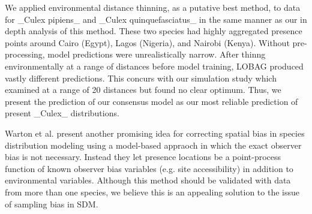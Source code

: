 We applied environmental distance thinning, as a putative best method, to data for _Culex pipiens_ and _Culex quinquefasciatus_ in the same manner as our in depth analysis of this method. These two species had highly aggregated presence points around Cairo (Egypt), Lagos (Nigeria), and Nairobi (Kenya). Without pre-processing, model predictions were unrealistically narrow. After thinng environmentally at a range of distances before model training, LOBAG produced vastly different predictions. This concurs with our simulation study which examined at a range of 20 distances but found no clear optimum. Thus, we present the prediction of our consensus model as our most reliable prediction of present _Culex_ distributions.

Warton et al. \cite{-Warton:2013im} present another promising idea for correcting spatial bias in species distribution modeling using a model-based appraoch in which the exact observer bias is not necessary. Instead they let presence locations be a point-process function of known observer bias variables (e.g. site accessibility) in addition to environmental variables. Although this method should be validated with data from more than one species, we believe this is an appealing solution to the issue of sampling bias in SDM.  


